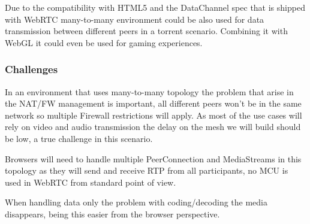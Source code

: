 Due to the compatibility with HTML5 and the DataChannel spec that is shipped with WebRTC many-to-many environment could be also used for data transmission between different peers in a torrent scenario. Combining it with WebGL it could even be used for gaming experiences.

\subsubsection{Challenges}

In an environment that uses many-to-many topology the problem that arise in the NAT/FW management is important, all different peers won't be in the same network so multiple Firewall restrictions will apply. As most of the use cases will rely on video and audio transmission the delay on the mesh we will build should be low, a true challenge in this scenario.

Browsers will need to handle multiple PeerConnection and MediaStreams in this topology as they will send and receive RTP from all participants, no MCU is used in WebRTC from standard point of view. 

When handling data only the problem with coding/decoding the media disappears, being this easier from the browser perspective.

